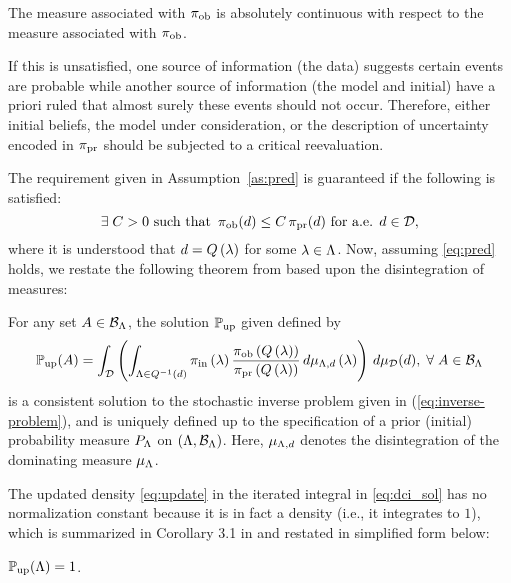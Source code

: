 \begin{assumption}\label{as:pred}
  The measure associated with $\operatorname*{\pi_{ob}}$ is absolutely continuous with respect to the measure associated with $\operatorname*{\pi_{ob}}$.
\end{assumption}

If this is unsatisfied, one source of information (the data) suggests certain events are probable while another source of information (the model and initial) have a priori ruled that almost surely these events should not occur.
Therefore, either initial beliefs, the model under consideration, or the description of uncertainty encoded in $\operatorname*{\pi_{pr}}$ should be subjected to a critical reevaluation.


The requirement given in Assumption~\ref{as:pred} is guaranteed if the following is satisfied:
\begin{equation}\label{eq:pred}
  \exists \; C>0 \text{ such that } \operatorname*{\pi_{ob}} (d) \leq C \operatorname*{\pi_{pr}}(d) \text{ for a.e. } d\in \mathcal{D},
\end{equation}
where it is understood that $d = Q\left ( \lambda \right )$ for some $\lambda \in {\Lambda}$.
Now, assuming \eqref{eq:pred} holds, we restate the following theorem from \cite{BJW18} based upon the disintegration of measures:


\begin{thm}
  For any set $A\in \mathcal{B}_{{\Lambda}}$, the solution $\operatorname*{\mathbb{P}_{up}}$ given defined by
  \begin{equation}\label{eq:dci_sol}
    \operatorname*{\mathbb{P}_{up}} (A) = \int_{\mathcal{D}} \left (  \int_{{\Lambda} \in Q^{-1}(d)}  \operatorname*{\pi_{in}}\left ( \lambda \right ) \frac{\operatorname*{\pi_{ob}}\left ( Q\left ( \lambda \right ) \right )}{\operatorname*{\pi_{pr}}\left ( Q\left ( \lambda \right ) \right )} \, d\mu_{{\Lambda}, d} \left ( \lambda \right ) \right ) \, d\mu_{\mathcal{D}}(d), \; \forall \; A \in \mathcal{B}_{{\Lambda}}
  \end{equation}
  is a consistent solution to the stochastic inverse problem given in (\ref{eq:inverse-problem}), and is uniquely defined up to the specification of a prior (initial) probability measure $P_{\Lambda}$ on $({\Lambda}, \mathcal{B}_{{\Lambda}})$.
  Here, $\mu_{{\Lambda}, d}$ denotes the disintegration of the dominating measure $\mu_{\Lambda}$.
\end{thm}

The updated density \eqref{eq:update} in the iterated integral in \eqref{eq:dci_sol} has no normalization constant because it is in fact a density (i.e., it integrates to $1$), which is summarized in Corollary 3.1 in \cite{BJW18} and restated in simplified form below:
\begin{cor}\label{cor:int}
$\operatorname*{\mathbb{P}_{up}}({\Lambda}) = 1$.
\end{cor}

